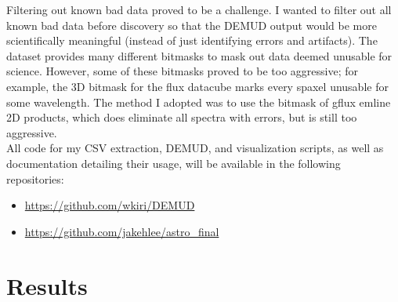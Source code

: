 \documentclass[10pt, letterpaper, notitlepage]{article}
\begin{document}
Filtering out known bad data proved to be a challenge. I wanted to
filter out all known bad data before discovery so that the DEMUD
output would be more scientifically meaningful (instead of just
identifying errors and artifacts). The dataset provides many different
bitmasks to mask out data deemed unusable for science. However, some of
these bitmasks proved to be too aggressive; for example, the 3D bitmask
for the flux datacube marks every spaxel unusable for some wavelength.
The method I adopted was to use the bitmask of gflux emline 2D
products, which does eliminate all spectra with errors, but is still
too aggressive.\\

All code for my CSV extraction, DEMUD, and visualization scripts, as well as documentation detailing their usage,
will be available in the following repositories:
\begin{itemize}
	\item \url{https://github.com/wkiri/DEMUD}
	\item \url{https://github.com/jakehlee/astro_final}
\end{itemize}

\section{Results}
\end{document}
